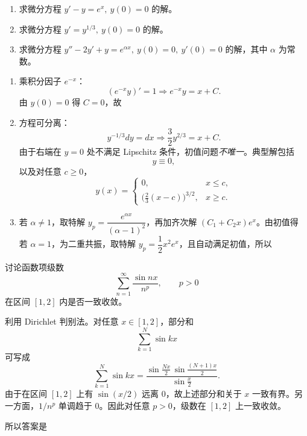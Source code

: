 ﻿

\begin{question}[三个初值问题]

\begin{enumerate}[label=(\arabic*),leftmargin=2.6em,itemsep=0.25em,topsep=0.2em]
\item 求微分方程 $y'-y=e^x,\ y(0)=0$ 的解。
\item 求微分方程 $y'=y^{1/3},\ y(0)=0$ 的解。
\item 求微分方程 $y''-2y'+y=e^{\alpha x},\ y(0)=0,\ y'(0)=0$ 的解，其中 $\alpha$ 为常数。
\end{enumerate}

\begin{solution}

\begin{enumerate}[label=(\arabic*),leftmargin=2.6em,itemsep=0.25em,topsep=0.2em]
\item 乘积分因子 $e^{-x}$：
\[
 (e^{-x}y)'=1
 \Longrightarrow e^{-x}y=x+C.
\]
由 $y(0)=0$ 得 $C=0$，故

\item 方程可分离：
\[
 y^{-1/3}dy=dx
 \Longrightarrow \frac32 y^{2/3}=x+C.
\]
由于右端在 $y=0$ 处不满足 Lipschitz 条件，初值问题\emph{不唯一}。典型解包括
\[
 y\equiv 0,
\]
以及对任意 $c\ge 0$，
\[
 y(x)=
 \begin{cases}
 0,&x\le c,\\
 \bigl(\tfrac23(x-c)\bigr)^{3/2},&x\ge c.
 \end{cases}
\]

\item 若 $\alpha\ne 1$，取特解 $y_p=\dfrac{e^{\alpha x}}{(\alpha-1)^2}$，再加齐次解 $(C_1+C_2x)e^x$。由初值得
若 $\alpha=1$，为二重共振，取特解 $y_p=\dfrac12 x^2e^x$，且自动满足初值，所以
\end{enumerate}

\end{solution}
\end{question}

\begin{question}[一致收敛]

讨论函数项级数
\[
\sum_{n=1}^{\infty}\frac{\sin nx}{n^p},\qquad p>0
\]
在区间 $[1,2]$ 内是否一致收敛。

\begin{solution}

利用 Dirichlet 判别法。对任意 $x\in[1,2]$，部分和
\[
\sum_{k=1}^{N}\sin kx
\]
可写成
\[
\sum_{k=1}^{N}\sin kx=
\frac{\sin\frac{Nx}{2}\,\sin\frac{(N+1)x}{2}}{\sin\frac{x}{2}}.
\]
由于在区间 $[1,2]$ 上有 $\sin(x/2)$ 远离 $0$，故上述部分和关于 $x$ 一致有界。另一方面，$1/n^p$ 单调趋于 $0$。因此对任意 $p>0$，级数在 $[1,2]$ 上一致收敛。

所以答案是

\end{solution}
\end{question}

